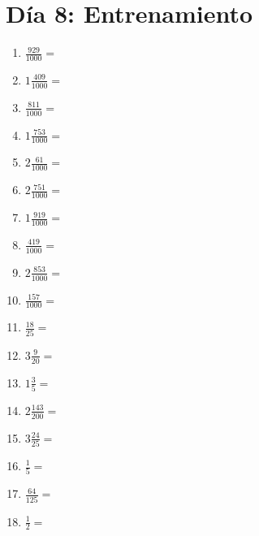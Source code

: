\documentclass[12pt]{article}
\begin{document}
\section*{Día 8: Entrenamiento}
\begin{enumerate}
\item \large $ \frac{929}{1000} = $ \vspace{1.5cm}
\item \large $ 1 \frac{409}{1000} = $ \vspace{1.5cm}
\item \large $ \frac{811}{1000} = $ \vspace{1.5cm}
\item \large $ 1 \frac{753}{1000} = $ \vspace{1.5cm}
\item \large $ 2 \frac{61}{1000} = $ \vspace{1.5cm}
\item \large $ 2 \frac{751}{1000} = $ \vspace{1.5cm}
\item \large $ 1 \frac{919}{1000} = $ \vspace{1.5cm}
\item \large $ \frac{419}{1000} = $ \vspace{1.5cm}
\item \large $ 2 \frac{853}{1000} = $ \vspace{1.5cm}
\item \large $ \frac{157}{1000} = $ \vspace{1.5cm}
\newpage
\item \large $ \frac{18}{25} = $ \vspace{1.5cm}
\item \large $ 3 \frac{9}{20} = $ \vspace{1.5cm}
\item \large $ 1 \frac{3}{5} = $ \vspace{1.5cm}
\item \large $ 2 \frac{143}{200} = $ \vspace{1.5cm}
\item \large $ 3 \frac{24}{25} = $ \vspace{1.5cm}
\item \large $ \frac{1}{5} = $ \vspace{1.5cm}
\item \large $ \frac{64}{125} = $ \vspace{1.5cm}
\item \large $ \frac{1}{2} = $ \vspace{1.5cm}

\end{enumerate}
\end{document}
